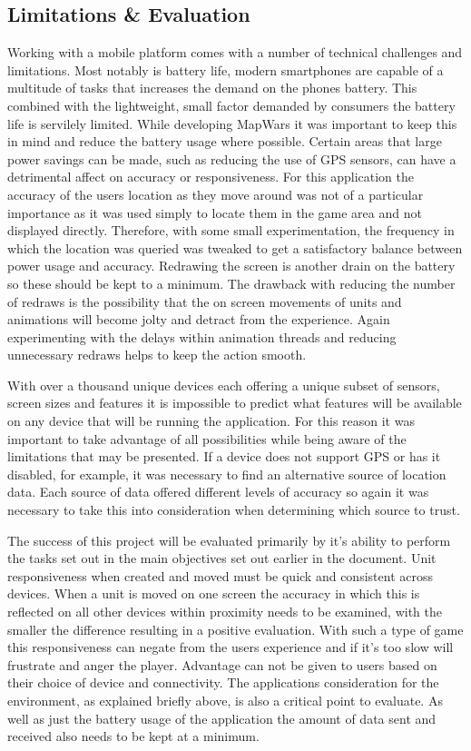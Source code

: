 \subsection{Limitations \& Evaluation}
Working with a mobile platform comes with a number of technical challenges and limitations. Most notably is battery life, modern smartphones are capable of a multitude of tasks that increases the demand on the phones battery. This combined with the lightweight, small factor demanded by consumers the battery life is servilely limited. While developing MapWars it was important to keep this in mind and reduce the battery usage where possible. Certain areas that large power savings can be made, such as reducing the use of GPS sensors, can have a detrimental affect on accuracy or responsiveness. For this application the accuracy of the users location as they move around was not of a particular importance as it was used simply to locate them in the game area and not displayed directly. Therefore, with some small experimentation, the frequency in which the location was queried was tweaked to get a satisfactory balance between power usage and accuracy. Redrawing the screen is another drain on the battery so these should be kept to a minimum. The drawback with reducing the number of redraws is the possibility that the on screen movements of units and animations will become jolty and detract from the experience. Again experimenting with the delays within animation threads and reducing unnecessary redraws helps to keep the action smooth.

With over a thousand unique devices each offering a unique subset of sensors, screen sizes and features it is impossible to predict what features will be available on any device that will be running the application. For this reason it was important to take advantage of all possibilities while being aware of the limitations that may be presented. If a device does not support GPS or has it disabled, for example, it was necessary to find an alternative source of location data. Each source of data offered different levels of accuracy so again it was necessary to take this into consideration when determining which source to trust.

The success of this project will be evaluated primarily by it's ability to perform the tasks set out in the main objectives set out earlier in the document. Unit responsiveness when created and moved must be quick and consistent across devices. When a unit is moved on one screen the accuracy in which this is reflected on all other devices within proximity needs to be examined, with the smaller the difference resulting in a positive evaluation. With such a type of game this responsiveness can negate from the users experience and if it's too slow will frustrate and anger the player. Advantage can not be given to users based on their choice of device and connectivity. The applications consideration for the environment, as explained briefly above, is also a critical point to evaluate. As well as just the battery usage of the application the amount of data sent and received also needs to be kept at a minimum.

